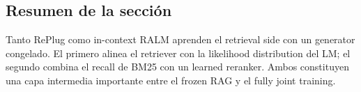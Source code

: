 
\subsection{Resumen de la sección}

Tanto RePlug como in-context RALM aprenden el retrieval side con un generator congelado. El primero alinea el retriever con la likelihood distribution del LM; el segundo combina el recall de BM25 con un learned reranker. Ambos constituyen una capa intermedia importante entre el frozen RAG y el fully joint training.
